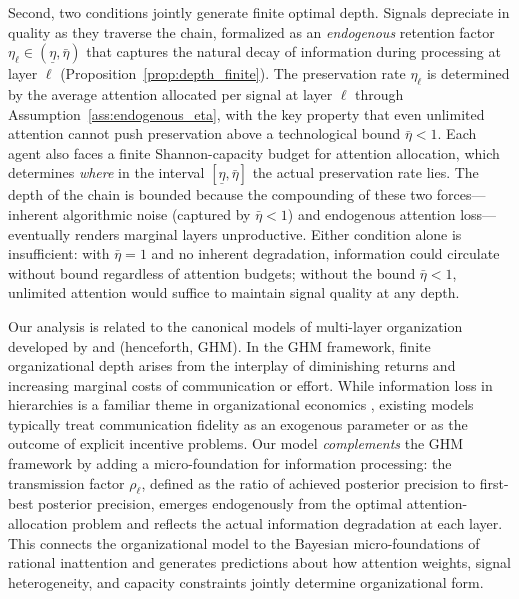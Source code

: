 Second, two conditions jointly generate finite optimal depth. Signals depreciate in quality as they traverse the chain, formalized as an \emph{endogenous} retention factor $\eta_\ell \in (\underline{\eta}, \bar{\eta})$ that captures the natural decay of information during processing at layer $\ell$ (Proposition~\ref{prop:depth_finite}). The preservation rate $\eta_\ell$ is determined by the average attention allocated per signal at layer $\ell$ through Assumption~\ref{ass:endogenous_eta}, with the key property that even unlimited attention cannot push preservation above a technological bound $\bar{\eta} < 1$. Each agent also faces a finite Shannon-capacity budget for attention allocation, which determines \emph{where} in the interval $[\underline{\eta}, \bar{\eta}]$ the actual preservation rate lies. The depth of the chain is bounded because the compounding of these two forces---inherent algorithmic noise (captured by $\bar{\eta} < 1$) and endogenous attention loss---eventually renders marginal layers unproductive. Either condition alone is insufficient: with $\bar{\eta}=1$ and no inherent degradation, information could circulate without bound regardless of attention budgets; without the bound $\bar{\eta} < 1$, unlimited attention would suffice to maintain signal quality at any depth.

Our analysis is related to the canonical models of multi-layer organization developed by \citet{garicano2000hierarchies} and \citet{dessein2006adaptive} (henceforth, GHM). In the GHM framework, finite organizational depth arises from the interplay of diminishing returns and increasing marginal costs of communication or effort. While information loss in hierarchies is a familiar theme in organizational economics \citep[e.g.,][]{sah1991fallibility,dessein2002authority,qian1994incentives}, existing models typically treat communication fidelity as an exogenous parameter or as the outcome of explicit incentive problems. Our model \emph{complements} the GHM framework by adding a micro-foundation for information processing: the transmission factor $\rho_\ell$, defined as the ratio of achieved posterior precision to first-best posterior precision, emerges endogenously from the optimal attention-allocation problem and reflects the actual information degradation at each layer. This connects the organizational model to the Bayesian micro-foundations of rational inattention \citep{sims2003implications} and generates predictions about how attention weights, signal heterogeneity, and capacity constraints jointly determine organizational form.

